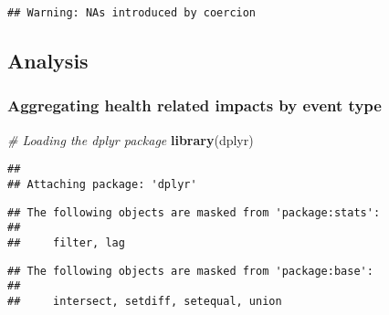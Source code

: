 \documentclass[
]{article}
\newenvironment{Shaded}{\begin{snugshade}}{\end{snugshade}}
\newcommand{\CommentTok}[1]{\textcolor[rgb]{0.56,0.35,0.01}{\textit{#1}}}
\newcommand{\DecValTok}[1]{\textcolor[rgb]{0.00,0.00,0.81}{#1}}
\newcommand{\KeywordTok}[1]{\textcolor[rgb]{0.13,0.29,0.53}{\textbf{#1}}}
\newcommand{\NormalTok}[1]{#1}
\newcommand{\OperatorTok}[1]{\textcolor[rgb]{0.81,0.36,0.00}{\textbf{#1}}}
\newcommand{\StringTok}[1]{\textcolor[rgb]{0.31,0.60,0.02}{#1}}
\begin{document}
\begin{verbatim}
## Warning: NAs introduced by coercion
\end{verbatim}

\begin{Shaded}
\end{Shaded}

\hypertarget{analysis}{%
\subsection{Analysis}\label{analysis}}

\hypertarget{aggregating-health-related-impacts-by-event-type}{%
\subsubsection{Aggregating health related impacts by event
type}\label{aggregating-health-related-impacts-by-event-type}}

\begin{Shaded}
\begin{Highlighting}[]
\CommentTok{# Loading the dplyr package}
\KeywordTok{library}\NormalTok{(dplyr)}
\end{Highlighting}
\end{Shaded}

\begin{verbatim}
## 
## Attaching package: 'dplyr'
\end{verbatim}

\begin{verbatim}
## The following objects are masked from 'package:stats':
## 
##     filter, lag
\end{verbatim}

\begin{verbatim}
## The following objects are masked from 'package:base':
## 
##     intersect, setdiff, setequal, union
\end{verbatim}
\end{document}
